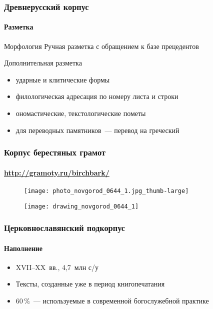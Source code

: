 \begin{frame}
  \frametitle{Древнерусский корпус}
  \framesubtitle{Разметка}

  \begin{block}{Морфология}
    Ручная разметка с обращением к базе прецедентов
  \end{block}

  \begin{block}{Дополнительная разметка}
    \begin{itemize}
      \item ударные и клитические формы
      \item филологическая адресация по номеру листа и строки
      \item ономастические, текстологические пометы
      \item для переводных памятников~--- перевод на греческий
    \end{itemize}
  \end{block}
\end{frame}

\begin{frame}
  \frametitle{Корпус берестяных грамот}
  \framesubtitle{\url{http://gramoty.ru/birchbark/}}

  \centering
  \begin{figure}[b]
    \texttt{[image: photo\_novgorod\_0644\_1.jpg\_thumb-large]}
  \end{figure}

  \begin{figure}[t]
    \texttt{[image: drawing\_novgorod\_0644\_1]}
  \end{figure}
\end{frame}

\begin{frame}
  \frametitle{Церковнославянский подкорпус}
  \framesubtitle{Наполнение}

  \begin{itemize}
    \item XVII--XX~вв., 4,7~млн с/у
    \item Тексты, созданные уже в период книгопечатания
    \item 60\,\%~--- используемые в современной богослужебной практике
  \end{itemize}

\end{frame}

